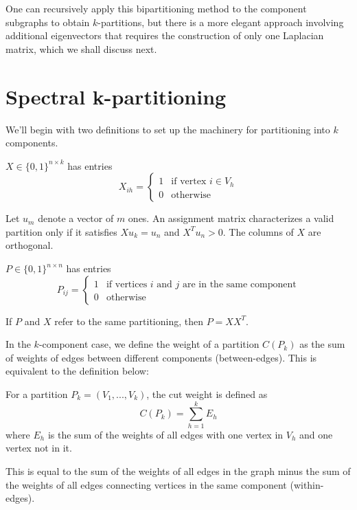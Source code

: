 One can recursively apply this bipartitioning method to the component
subgraphs to obtain $k$-partitions, but there is a more elegant
approach involving additional eigenvectors that requires the
construction of only one Laplacian matrix, which we shall discuss next.

\section{Spectral k-partitioning}

We'll begin with two definitions to set up the machinery for
partitioning into $k$ components.

\begin{definition}
 $X \in \{0, 1\}^{n \times k}$ has entries
\[ X_{ih} = \begin{cases}
		1 & \mbox{if vertex } i \in V_h \\
		0 & \mbox{otherwise}
\end{cases} \]
\end{definition}

Let $u_m$ denote a vector of $m$ ones.
An assignment matrix characterizes a valid partition only if it
satisfies $X u_k = u_n$ and $X^T u_n > 0$.
The columns of $X$ are orthogonal.

\begin{definition}
 $P \in \{0, 1\}^{n \times n}$ has entries
\[ P_{ij} = \begin{cases}
		1 & \mbox{if vertices } i \mbox{ and } j
		    \mbox{ are in the same component} \\
		0 & \mbox{otherwise}
\end{cases} \]
\end{definition}

If $P$ and $X$ refer to the same partitioning, then $P = X X^T$.

In the $k$-component case, we define the weight of a partition
$C(P_k)$ as the sum of weights of edges between different components
(between-edges). This is equivalent to the definition below:

\begin{definition}
 For a partition $P_k = (V_1, ..., V_k)$, the cut weight
is defined as
\[ C(P_k) = \sum_{h=1}^k E_h \]
where $E_h$ is the sum of the weights of all edges with one vertex in
$V_h$ and one vertex not in it.
\end{definition}

This is equal to the sum of the weights of all edges in the graph minus
the sum of the weights of all edges connecting vertices in the same
component (within-edges).

